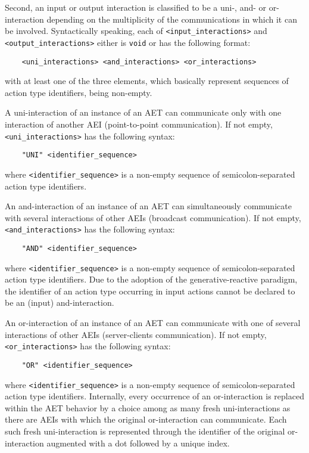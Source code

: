 Second, an input or output interaction is classified to be a uni-, and- or or-interaction depending on the
multiplicity of the communications in which it can be involved. Syntactically speaking, each of
{\tt <input\_interactions>} and {\tt <output\_interactions>} either is {\tt void} or has the following
format:

	\begin{verbatim}
    <uni_interactions> <and_interactions> <or_interactions>
	\end{verbatim}

\noindent with at least one of the three elements, which basically represent sequences of action type
identifiers, being non-empty.

A uni-interaction of an instance of an AET can communicate only with one interaction of another AEI
(point-to-point communication). If not empty, {\tt <uni\_interactions>} has the following syntax:

	\begin{verbatim}
    "UNI" <identifier_sequence>
	\end{verbatim}

\noindent where {\tt <identifier\_sequence>} is a non-empty sequence of semicolon-separated action type
identifiers.

An and-interaction of an instance of an AET can simultaneously communicate with several interactions of
other AEIs (broadcast communication). If not empty, {\tt <and\_interactions>} has the following syntax:

	\begin{verbatim}
    "AND" <identifier_sequence>
	\end{verbatim}

\noindent where {\tt <identifier\_sequence>} is a non-empty sequence of semicolon-separated action type
identifiers. Due to the adoption of the generative-reactive paradigm, the identifier of an action type
occurring in input actions cannot be declared to be an (input) and-interaction.

An or-interaction of an instance of an AET can communicate with one of several interactions of other AEIs
(server-clients communication). If not empty, {\tt <or\_interactions>} has the following syntax:

	\begin{verbatim}
    "OR" <identifier_sequence>
	\end{verbatim}

\noindent where {\tt <identifier\_sequence>} is a non-empty sequence of semicolon-separated action type
identifiers. Internally, every occurrence of an or-interaction is replaced within the AET behavior by a
choice among as many fresh uni-interactions as there are AEIs with which the original or-interaction can
communicate. Each such fresh uni-interaction is represented through the identifier of the original
or-interaction augmented with a dot followed by a unique index.



